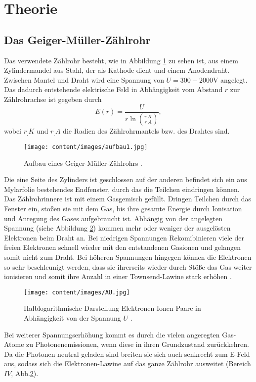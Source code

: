 \section{Theorie}
\label{sec:Theorie}

\subsection{Das Geiger-Müller-Zählrohr}
Das verwendete Zählrohr besteht, wie in Abbildung \ref{fig:GMZ} zu sehen ist, aus einem Zylindermandel aus Stahl, der als Kathode dient und einem Anodendraht. Zwischen Mantel und Draht wird eine Spannung von $U= 300 - 2000 \text{V}$ angelegt. Das dadurch entstehende elektrische Feld in Abhängigkeit vom Abstand $r$ zur Zählrohrachse ist gegeben durch
\[
E(r)=\frac{U}{r\ln\left(\frac{r_.K}{r_.A}\right)},
\]
wobei $r_.K$ und $r_.A$ die Radien des Zählrohrmantels bzw. des Drahtes sind.\newline
\begin{figure}
\centering
\texttt{[image: content/images/aufbau1.jpg]}
\caption{Aufbau eines Geiger-Müller-Zählrohrs \cite{V703}.}
\label{fig:GMZ}
\end{figure}
Die eine Seite des Zylinders ist geschlossen auf der anderen befindet sich ein aus Mylarfolie bestehendes Endfenster, durch das die Teilchen eindringen können. Das Zählrohrinnere ist mit einem Gasgemisch gefüllt.
Dringen Teilchen durch das Fenster ein, stoßen sie mit dem Gas, bis ihre gesamte Energie durch Ionisation und Anregung des Gases aufgebraucht ist.\newline
Abhängig von der angelegten Spannung (siehe Abbildung \ref{fig:AU})
kommen mehr oder weniger der ausgelösten Elektronen beim Draht an.
Bei niedrigen Spannungen Rekomibinieren viele der freien Elektronen schnell wieder mit den entstandenen Gasionen und gelangen somit nicht zum Draht. Bei höheren Spannungen hingegen können die Elektronen so sehr beschleunigt werden, dass sie ihrerseits wieder durch Stöße das Gas weiter ionisieren und somit ihre Anzahl in einer Townsend-Lawine stark erhöhen \cite{V703}.\newline
\begin{figure}
\centering
\texttt{[image: content/images/AU.jpg]}
\caption{Halblogarithmische Darstellung Elektronen-Ionen-Paare in Abhängigkeit von der Spannung $U$ \cite{V703}.}
\label{fig:AU}
\end{figure}
Bei weiterer Spannungserhöhung kommt es durch die vielen angeregten Gas-Atome zu Photonenemissionen, wenn diese in ihren Grundzustand zurückkehren. Da die Photonen neutral geladen sind breiten sie sich auch senkrecht zum E-Feld aus, sodass sich die Elektronen-Lawine auf das ganze Zählrohr ausweitet (Bereich $IV$, Abb.\ref{fig:AU}).
